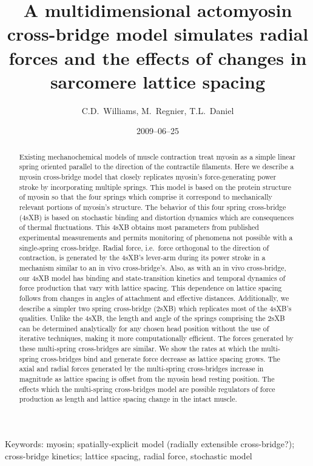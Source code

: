 \documentclass[]{article}
\title{A multidimensional actomyosin cross-bridge model simulates radial forces and the effects of changes in sarcomere lattice spacing}
\author{C.D.\ Williams, M.\ Regnier, T.L.\ Daniel}
\date{2009--06--25}
\begin{document}
\maketitle{}

\begin{abstract} 
Existing mechanochemical models of muscle contraction treat myosin as a simple linear spring oriented parallel to the direction of the contractile filaments.
Here we describe a myosin cross-bridge model that closely replicates myosin's force-generating power stroke by incorporating multiple springs. 
This model is based on the protein structure of myosin so that the four springs which comprise it correspond to mechanically relevant portions of myosin's structure.
The behavior of this four spring cross-bridge (4sXB) is based on stochastic binding and distortion dynamics which are consequences of thermal fluctuations.  
This 4sXB obtains most parameters from published experimental measurements and permits monitoring of phenomena not possible with a single-spring cross-bridge.
Radial force, i.e.\ force orthogonal to the direction of contraction, is generated by the 4sXB's lever-arm during its power stroke in a mechanism similar to an in vivo cross-bridge's. 
Also, as with an in vivo cross-bridge, our 4sXB model has binding and state-transition kinetics and temporal dynamics of force production that vary with lattice spacing. 
This dependence on lattice spacing follows from changes in angles of attachment and effective distances. 
Additionally, we describe a simpler two spring cross-bridge (2sXB) which replicates most of the 4sXB's qualities. 
Unlike the 4sXB, the length and angle of the springs comprising the 2sXB can be determined analytically for any chosen head position without the use of iterative techniques,  making it more computationally efficient.
The forces generated by these multi-spring cross-bridges are similar. 
We show the rates at which the multi-spring cross-bridges bind and generate force decrease as lattice spacing grows. 
The axial and radial forces generated by the multi-spring cross-bridges increase in magnitude as lattice spacing is offset from the myosin head resting position. 
The effects which the multi-spring cross-bridges model are possible regulators of force production as length and lattice spacing change in the intact muscle.
\end{abstract}

Keywords: myosin; spatially-explicit model (radially extensible cross-bridge?); cross-bridge kinetics; lattice spacing, radial force, stochastic model
\end{document}
